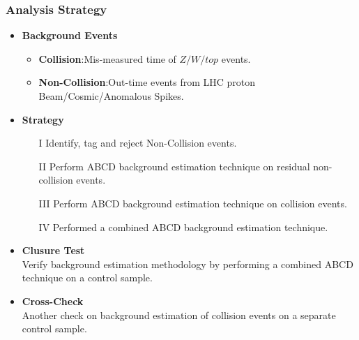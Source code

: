 \documentclass{beamer}
\begin{document}
\begin{frame}
\frametitle{Analysis Strategy}
\begin{itemize}
 \item \textcolor{UMN@Maroon}{\textbf{Background Events}}
  \begin{itemize}
   \item \textbf{Collision}:Mis-measured time of $Z/W/top$ events.
   \item \textbf{Non-Collision}:Out-time events from LHC proton Beam/Cosmic/Anomalous Spikes.
  \end{itemize}
 \item \textcolor{UMN@Maroon}{\textbf{Strategy}}
   \begin{enumerate}
    \item[I] Identify, tag and reject Non-Collision events.
    \item[II] Perform ABCD background estimation technique on residual non-collision events.
    \item[III]Perform ABCD background estimation technique on collision events.
    \item[IV] Performed a combined ABCD background estimation technique. 
    \end{enumerate}
 \item \textcolor{UMN@Maroon}{\textbf{Clusure Test}}\\
 Verify background estimation methodology by performing a combined ABCD technique on a control sample.
 \item \textcolor{UMN@Maroon}{\textbf{Cross-Check}}\\
 Another check on background estimation of collision events on a separate control sample.
\end{itemize}  
\end{frame}
\end{document}
